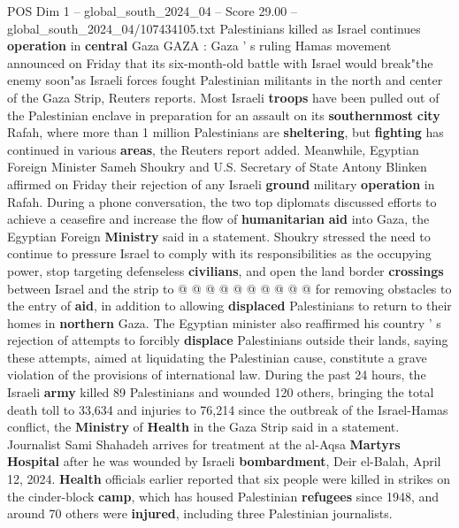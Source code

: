 \begin{textsample}{POS Dim 1 – global\_south\_2024\_04 – Score 29.00 – global\_south\_2024\_04/107434105.txt}  \label{ex:f1_pos_150}
Palestinians killed as Israel continues \textbf{operation} in \textbf{central} Gaza GAZA : Gaza ' s ruling Hamas movement announced on Friday that its six-month-old battle with Israel would break"the enemy soon"as Israeli forces fought Palestinian militants in the north and center of the Gaza Strip, Reuters reports.
Most Israeli \textbf{troops} have been pulled out of the Palestinian enclave in preparation for an assault on its \textbf{southernmost} \textbf{city} Rafah, where more than 1 million Palestinians are \textbf{sheltering}, but \textbf{fighting} has continued in various \textbf{areas}, the Reuters report added.
Meanwhile, Egyptian Foreign Minister Sameh Shoukry and U.S.
Secretary of State Antony Blinken affirmed on Friday their rejection of any Israeli \textbf{ground} military \textbf{operation} in Rafah.
During a phone conversation, the two top diplomats discussed efforts to achieve a ceasefire and increase the flow of \textbf{humanitarian} \textbf{aid} into Gaza, the Egyptian Foreign \textbf{Ministry} said in a statement.
Shoukry stressed the need to continue to pressure Israel to comply with its responsibilities as the occupying power, stop targeting defenseless \textbf{civilians}, and open the land border \textbf{crossings} between Israel and the strip to @ @ @ @ @ @ @ @ @ @ for removing obstacles to the entry of \textbf{aid}, in addition to allowing \textbf{displaced} Palestinians to return to their homes in \textbf{northern} Gaza.
The Egyptian minister also reaffirmed his country ' s rejection of attempts to forcibly \textbf{displace} Palestinians outside their lands, saying these attempts, aimed at liquidating the Palestinian cause, constitute a grave violation of the provisions of international law.
During the past 24 hours, the Israeli \textbf{army} killed 89 Palestinians and wounded 120 others, bringing the total death toll to 33,634 and injuries to 76,214 since the outbreak of the Israel-Hamas conflict, the \textbf{Ministry} of \textbf{Health} in the Gaza Strip said in a statement.
Journalist Sami Shahadeh arrives for treatment at the al-Aqsa \textbf{Martyrs} \textbf{Hospital} after he was wounded by Israeli \textbf{bombardment}, Deir el-Balah, April 12, 2024. \textbf{Health} officials earlier reported that six people were killed in strikes on the cinder-block \textbf{camp}, which has housed Palestinian \textbf{refugees} since 1948, and around 70 others were \textbf{injured}, including three Palestinian journalists.

\end{textsample}
